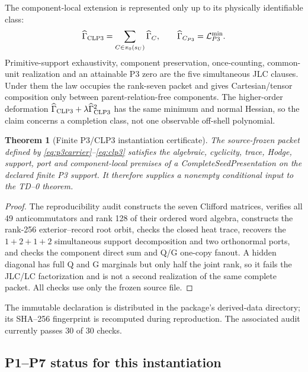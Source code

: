 \documentclass[11pt,a4paper]{article}
\newtheorem{theorem}[definition]{Theorem}
\theoremstyle{remark}
\begin{document}
The component-local extension is represented only up to its physically
identifiable class:
\begin{equation}
 \widehat\Gamma_{\rm CLP3}=\sum_{C\in\pi_0(s_U)}\widehat\Gamma_C,
 \qquad
 \widehat\Gamma_{C_{P3}}=\mathcal L_{P3}^{\min}.
 \label{eq:clp3}
\end{equation}
Primitive-support exhaustivity, component preservation, once-counting,
common-unit realization and an attainable P3 zero are the five simultaneous
JLC clauses.  Under them the law occupies the rank-seven packet and gives
Cartesian/tensor composition only between parent-relation-free components.
The higher-order deformation
$\widehat\Gamma_{\rm CLP3}+\lambda\widehat\Gamma_{\rm CLP3}^2$ has the same
minimum and normal Hessian, so the claim concerns a completion class, not one
observable off-shell polynomial.

\begin{theorem}[Finite P3/CLP3 instantiation certificate]
The source-frozen packet defined by
\eqref{eq:p3carrier}--\eqref{eq:clp3} satisfies the algebraic, cyclicity,
trace, Hodge, support, port and component-local premises of a
\emph{CompleteSeedPresentation} on the declared finite P3 support.  It
therefore supplies a nonempty conditional input to the TD--0 theorem.
\end{theorem}

\begin{proof}
The reproducibility audit constructs the seven Clifford matrices, verifies all
49 anticommutators and rank 128 of their ordered word algebra, constructs the
rank-256 exterior--record root orbit, checks the closed heat trace, recovers
the $1+2+1+2$ simultaneous support decomposition and two orthonormal ports,
and checks the component direct sum and Q/G one-copy fanout.  A hidden
diagonal has full Q and G marginals but only half the joint rank, so it fails
the JLC/LC factorization and is not a second realization of the same complete
packet.  All checks use only the frozen source file.
\end{proof}

The immutable declaration is distributed in the package's derived-data
directory; its SHA--256 fingerprint is recomputed during reproduction.  The
associated audit currently passes 30 of 30 checks.

\subsection{P1--P7 status for this instantiation}
\end{document}
